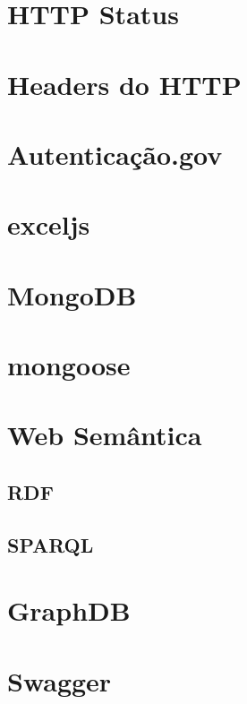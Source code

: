 \section{HTTP Status}

\section{Headers do HTTP}

\section{Autenticação.gov}
\cite{agov}

\section{exceljs}

\section{MongoDB}
\cite{wdmongo}

\section{mongoose}

\section{Web Semântica}
\cite{lsparql}

\subsection{RDF}
\cite{lsparql}

\subsection{SPARQL}
\cite{lsparql}


\section{GraphDB}

\section{Swagger}

